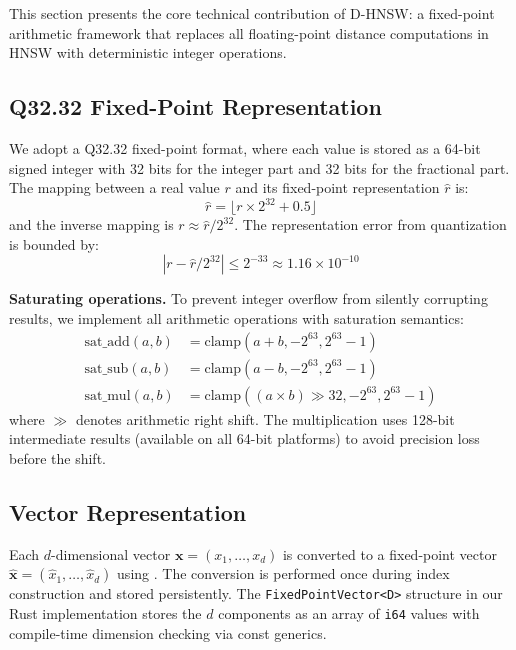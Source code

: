 \documentclass[10pt,journal]{IEEEtran}
\newcommand{\dhnsw}{\textsc{D-HNSW}}
\newcommand{\hnsw}{\textsc{HNSW}}
\begin{document}
This section presents the core technical contribution of \dhnsw{}: a fixed-point arithmetic framework that replaces all floating-point distance computations in \hnsw{} with deterministic integer operations.

\subsection{Q32.32 Fixed-Point Representation}

We adopt a Q32.32 fixed-point format, where each value is stored as a 64-bit signed integer with 32 bits for the integer part and 32 bits for the fractional part. The mapping between a real value $r$ and its fixed-point representation $\hat{r}$ is:
\begin{equation}
  \label{eq:fp_encode}
  \hat{r} = \lfloor r \times 2^{32} + 0.5 \rfloor
\end{equation}
and the inverse mapping is $r \approx \hat{r} / 2^{32}$. The representation error from quantization is bounded by:
\begin{equation}
  |r - \hat{r}/2^{32}| \leq 2^{-33} \approx 1.16 \times 10^{-10}
\end{equation}

\textbf{Saturating operations.} To prevent integer overflow from silently corrupting results, we implement all arithmetic operations with saturation semantics:
\begin{align}
  \text{sat\_add}(a, b) &= \text{clamp}(a + b, -2^{63}, 2^{63}{-}1) \\
  \text{sat\_sub}(a, b) &= \text{clamp}(a - b, -2^{63}, 2^{63}{-}1) \\
  \text{sat\_mul}(a, b) &= \text{clamp}((a \times b) \gg 32, -2^{63}, 2^{63}{-}1)
\end{align}
where $\gg$ denotes arithmetic right shift. The multiplication uses 128-bit intermediate results (available on all 64-bit platforms) to avoid precision loss before the shift.

\subsection{Vector Representation}

Each $d$-dimensional vector $\mathbf{x} = (x_1, \ldots, x_d)$ is converted to a fixed-point vector $\hat{\mathbf{x}} = (\hat{x}_1, \ldots, \hat{x}_d)$ using . The conversion is performed once during index construction and stored persistently. The \texttt{FixedPointVector<D>} structure in our Rust implementation stores the $d$ components as an array of \texttt{i64} values with compile-time dimension checking via const generics.
\end{document}
